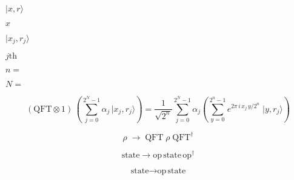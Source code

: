 \documentclass{article}
\begin{document}
$|x,r\rangle$
\pagebreak

$x$
\pagebreak

$|x_j,r_j\rangle$
\pagebreak

$j\text{th}$
\pagebreak

$n =$
\pagebreak

$N =$
\pagebreak

\[
     (\text{QFT}\otimes 1) \, \left(  \sum\limits_{j=0}^{2^N-1} \alpha_j \, |x_j,r_j\rangle \right) 
     = 
     \frac{1}{\sqrt{2^n}}
      \sum\limits_{j=0}^{2^N-1} \alpha_j \left( 
          \sum\limits_{y=0}^{2^n-1} e^{2 \pi \, i \, x_j \, y / 2^n} \; 
          |y,r_j \rangle
      \right)
  \]
\pagebreak

\[
     \rho \; \rightarrow \; \text{QFT} \; \rho \; \text{QFT}^{\dagger}
  \]
\pagebreak

\[
        \text{state} \to \text{op} \, \text{state} \, \text{op}^\dagger
\]
\pagebreak

\[
        \text{state} \to \text{op} \, \text{state}
\]
\pagebreak
\end{document}

